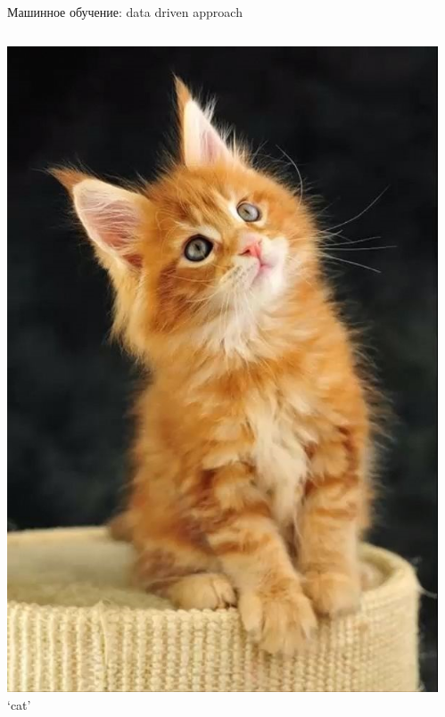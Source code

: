 \documentclass[aspectratio=169, professionalfonts]{beamer}
\begin{document}
\begin{frame}{Машинное обучение: data driven approach}
\begin{columns}
\begin{column}{.1\linewidth}
            \includegraphics[width=\linewidth]{figures/fig34-dataset-sample.jpg}
            `cat'
        \end{column}
        \begin{column}{.1\linewidth}
            \centering

\end{column}
\end{columns}
\end{frame}
\end{document}
